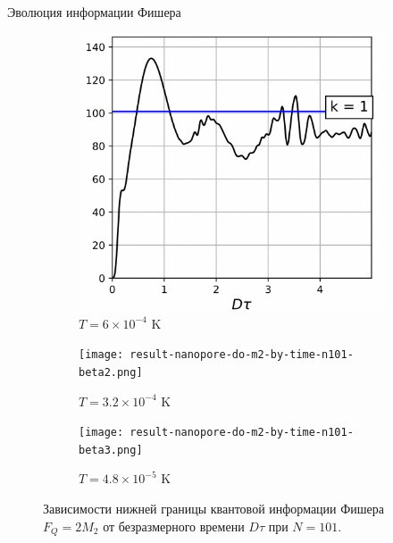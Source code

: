\begin{frame}{Эволюция информации Фишера}
  \begin{figure}
    \begin{subfigure}[t]{0.3\textwidth}
    \includegraphics[width=\textwidth]{src/figures/result-nanopore-do-m2-by-time-n101-beta1.png}
    \caption{$T = 6 \times 10^{-4}$ K}
    \end{subfigure}
    \hfill
    \begin{subfigure}[t]{0.3\textwidth}
      \texttt{[image: result-nanopore-do-m2-by-time-n101-beta2.png]}
      \caption{$T = 3.2 \times 10^{-4}$ K}
    \end{subfigure}
    \hfill
    \begin{subfigure}[t]{0.3\textwidth}
      \texttt{[image: result-nanopore-do-m2-by-time-n101-beta3.png]}
      \caption{$T = 4.8 \times 10^{-5}$ K}
    \end{subfigure}
    \caption{Зависимости нижней границы квантовой информации Фишера $F_Q = 2M_2$ от безразмерного времени $D\tau$ при $N = 101$.}
  \end{figure}
\end{frame}

